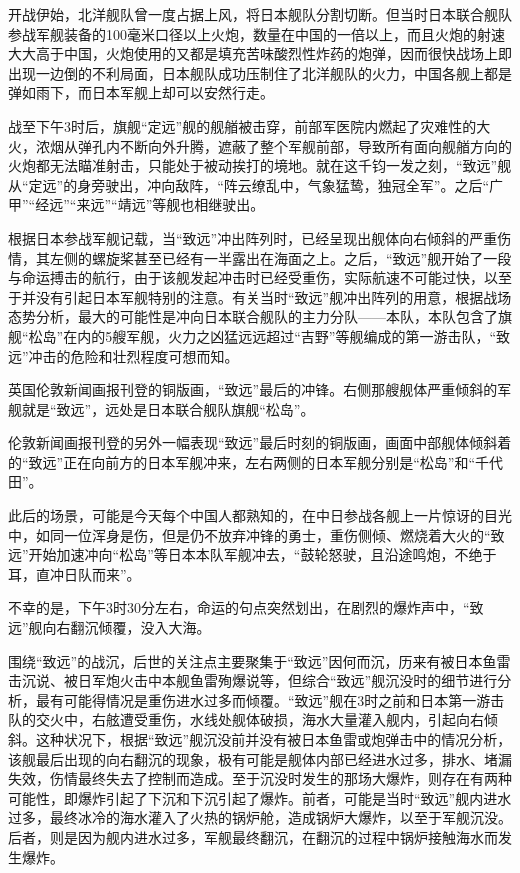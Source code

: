 \documentclass[12pt,UTF8]{ctexbook}
\begin{document}
开战伊始，北洋舰队曾一度占据上风，将日本舰队分割切断。但当时日本联合舰队参战军舰装备的100毫米口径以上火炮，数量在中国的一倍以上，而且火炮的射速大大高于中国，火炮使用的又都是填充苦味酸烈性炸药的炮弹，因而很快战场上即出现一边倒的不利局面，日本舰队成功压制住了北洋舰队的火力，中国各舰上都是弹如雨下，而日本军舰上却可以安然行走。

战至下午3时后，旗舰“定远”舰的舰艏被击穿，前部军医院内燃起了灾难性的大火，浓烟从弹孔内不断向外升腾，遮蔽了整个军舰前部，导致所有面向舰艏方向的火炮都无法瞄准射击，只能处于被动挨打的境地。就在这千钧一发之刻，“致远”舰从“定远”的身旁驶出，冲向敌阵，“阵云缭乱中，气象猛鸷，独冠全军”。之后“广甲”“经远”“来远”“靖远”等舰也相继驶出。

根据日本参战军舰记载，当“致远”冲出阵列时，已经呈现出舰体向右倾斜的严重伤情，其左侧的螺旋桨甚至已经有一半露出在海面之上。之后，“致远”舰开始了一段与命运搏击的航行，由于该舰发起冲击时已经受重伤，实际航速不可能过快，以至于并没有引起日本军舰特别的注意。有关当时“致远”舰冲出阵列的用意，根据战场态势分析，最大的可能性是冲向日本联合舰队的主力分队——本队，本队包含了旗舰“松岛”在内的5艘军舰，火力之凶猛远远超过“吉野”等舰编成的第一游击队，“致远”冲击的危险和壮烈程度可想而知。

英国伦敦新闻画报刊登的铜版画，“致远”最后的冲锋。右侧那艘舰体严重倾斜的军舰就是“致远”，远处是日本联合舰队旗舰“松岛”。

伦敦新闻画报刊登的另外一幅表现“致远”最后时刻的铜版画，画面中部舰体倾斜着的“致远”正在向前方的日本军舰冲来，左右两侧的日本军舰分别是“松岛”和“千代田”。

此后的场景，可能是今天每个中国人都熟知的，在中日参战各舰上一片惊讶的目光中，如同一位浑身是伤，但是仍不放弃冲锋的勇士，重伤侧倾、燃烧着大火的“致远”开始加速冲向“松岛”等日本本队军舰冲去，“鼓轮怒驶，且沿途鸣炮，不绝于耳，直冲日队而来”。

不幸的是，下午3时30分左右，命运的句点突然划出，在剧烈的爆炸声中，“致远”舰向右翻沉倾覆，没入大海。

围绕“致远”的战沉，后世的关注点主要聚集于“致远”因何而沉，历来有被日本鱼雷击沉说、被日军炮火击中本舰鱼雷殉爆说等，但综合“致远”舰沉没时的细节进行分析，最有可能得情况是重伤进水过多而倾覆。“致远”舰在3时之前和日本第一游击队的交火中，右舷遭受重伤，水线处舰体破损，海水大量灌入舰内，引起向右倾斜。这种状况下，根据“致远”舰沉没前并没有被日本鱼雷或炮弹击中的情况分析，该舰最后出现的向右翻沉的现象，极有可能是舰体内部已经进水过多，排水、堵漏失效，伤情最终失去了控制而造成。至于沉没时发生的那场大爆炸，则存在有两种可能性，即爆炸引起了下沉和下沉引起了爆炸。前者，可能是当时“致远”舰内进水过多，最终冰冷的海水灌入了火热的锅炉舱，造成锅炉大爆炸，以至于军舰沉没。后者，则是因为舰内进水过多，军舰最终翻沉，在翻沉的过程中锅炉接触海水而发生爆炸。
\end{document}

